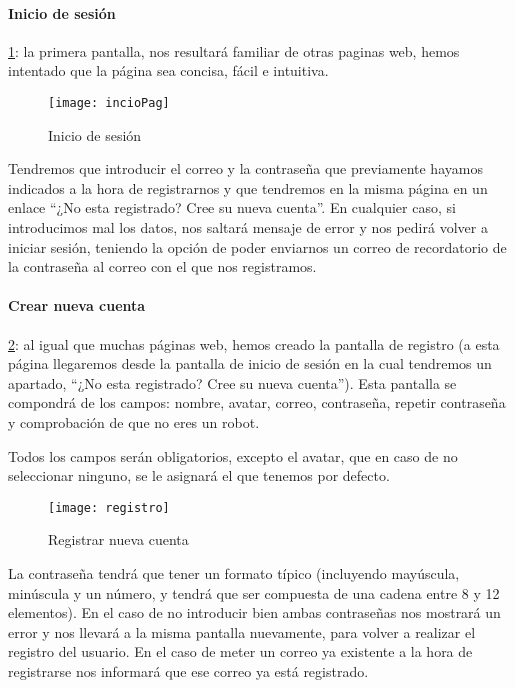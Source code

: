 \paragraph{Inicio de sesión}\ref{fig:inicio}: la primera pantalla, nos resultará familiar de otras paginas web, hemos intentado que la página sea concisa, fácil e intuitiva. 

\begin{figure}[H]
    \centering
    \texttt{[image: incioPag]}
    \caption{Inicio de sesión}
    \label{fig:inicio}
\end{figure}

Tendremos que introducir el correo y la contraseña que previamente hayamos indicados a la hora de registrarnos y que tendremos en la misma página en un enlace ``¿No esta registrado? Cree su nueva cuenta''. En cualquier caso, si introducimos mal los datos, nos saltará mensaje de error y nos pedirá volver a iniciar sesión, teniendo la opción de poder enviarnos un correo de recordatorio de la contraseña al correo con el que nos registramos.

\paragraph{Crear nueva cuenta} \ref{fig:registro}: al igual que muchas páginas web, hemos creado la pantalla de registro (a esta página llegaremos desde la pantalla de inicio de sesión en la cual tendremos un apartado, ``¿No esta registrado? Cree su nueva cuenta''). Esta pantalla se compondrá de los campos: nombre, avatar, correo, contraseña, repetir contraseña y comprobación de que no eres un robot.

Todos los campos serán obligatorios, excepto el avatar, que en caso de no seleccionar ninguno, se le asignará el que tenemos por defecto.

\begin{figure}[h!]
    \centering
    \texttt{[image: registro]}
    \caption{Registrar nueva cuenta}
    \label{fig:registro}
\end{figure}

La contraseña tendrá que tener un formato típico (incluyendo mayúscula, minúscula y un número, y tendrá que ser compuesta de una cadena entre 8 y 12 elementos). En el caso de no introducir bien ambas contraseñas nos mostrará un error y nos llevará a la misma pantalla nuevamente, para volver a realizar el registro del usuario. En el caso de meter un correo ya existente a la hora de registrarse nos informará que ese correo ya está registrado. 

